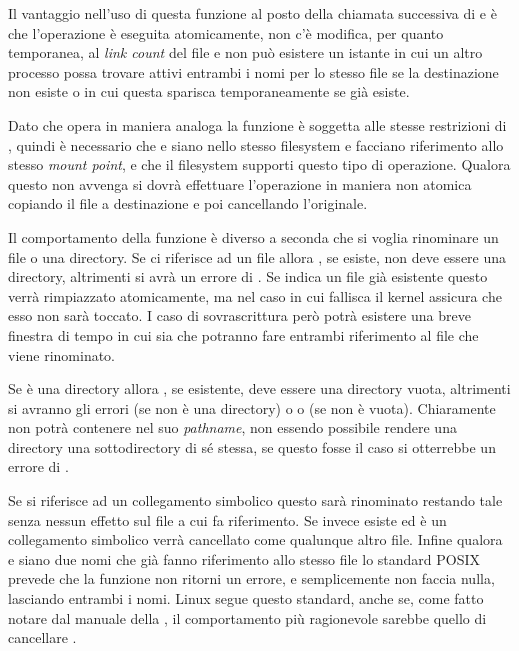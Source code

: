 Il vantaggio nell'uso di questa funzione al posto della chiamata successiva di
 e  è che l'operazione è eseguita atomicamente, non
c'è modifica, per quanto temporanea, al \textit{link count} del file e non può
esistere un istante in cui un altro processo possa trovare attivi entrambi i
nomi per lo stesso file se la destinazione non esiste o in cui questa sparisca
temporaneamente se già esiste.

Dato che opera in maniera analoga la funzione è soggetta alle stesse
restrizioni di , quindi è necessario che 
e  siano nello stesso filesystem e facciano riferimento allo
stesso \textit{mount point}, e che il filesystem supporti questo tipo di
operazione. Qualora questo non avvenga si dovrà effettuare l'operazione in
maniera non atomica copiando il file a destinazione e poi cancellando
l'originale.

Il comportamento della funzione è diverso a seconda che si voglia rinominare
un file o una directory. Se ci riferisce ad un file allora , se
esiste, non deve essere una directory, altrimenti si avrà un errore di
. Se  indica un file già esistente questo verrà
rimpiazzato atomicamente, ma nel caso in cui  fallisca il kernel
assicura che esso non sarà toccato. I caso di sovrascrittura però potrà
esistere una breve finestra di tempo in cui sia 
che  potranno fare entrambi riferimento al file che viene
rinominato.

Se  è una directory allora , se esistente, deve
essere una directory vuota, altrimenti si avranno gli errori 
(se non è una directory) o  o  (se non è
vuota). Chiaramente  non potrà contenere  nel
suo \textit{pathname}, non essendo possibile rendere una directory una
sottodirectory di sé stessa, se questo fosse il caso si otterrebbe un errore
di .

Se  si riferisce ad un collegamento simbolico questo sarà
rinominato restando tale senza nessun effetto sul file a cui fa riferimento.
Se invece  esiste ed è un collegamento simbolico verrà
cancellato come qualunque altro file.  Infine qualora 
e  siano due nomi che già fanno riferimento allo stesso file lo
standard POSIX prevede che la funzione non ritorni un errore, e semplicemente
non faccia nulla, lasciando entrambi i nomi.  Linux segue questo standard,
anche se, come fatto notare dal manuale della , il comportamento
più ragionevole sarebbe quello di cancellare .

